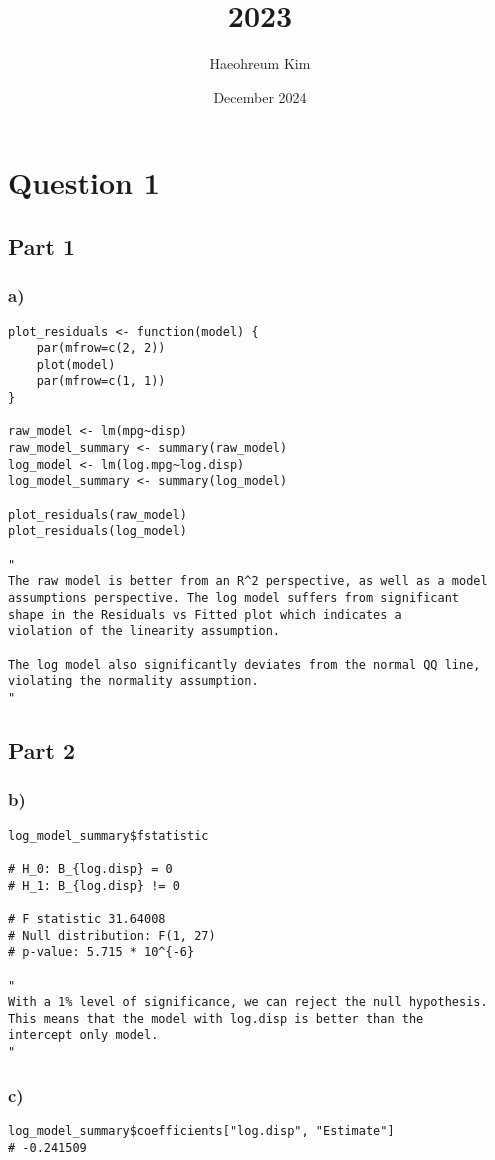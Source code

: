 \documentclass{article}
\title{2023}
\author{Haeohreum Kim}
\date{December 2024}
\begin{document}
\maketitle
\section*{Question 1}
\subsection*{Part 1}
\subsubsection*{a)}
\begin{verbatim}
plot_residuals <- function(model) {
    par(mfrow=c(2, 2))
    plot(model)
    par(mfrow=c(1, 1))
}

raw_model <- lm(mpg~disp)
raw_model_summary <- summary(raw_model)
log_model <- lm(log.mpg~log.disp)
log_model_summary <- summary(log_model)

plot_residuals(raw_model)
plot_residuals(log_model)

"
The raw model is better from an R^2 perspective, as well as a model
assumptions perspective. The log model suffers from significant
shape in the Residuals vs Fitted plot which indicates a
violation of the linearity assumption. 

The log model also significantly deviates from the normal QQ line,
violating the normality assumption.
"
\end{verbatim}
\subsection*{Part 2}
\subsubsection*{b)}
\begin{verbatim}
log_model_summary$fstatistic

# H_0: B_{log.disp} = 0
# H_1: B_{log.disp} != 0

# F statistic 31.64008
# Null distribution: F(1, 27)
# p-value: 5.715 * 10^{-6}

"
With a 1% level of significance, we can reject the null hypothesis.
This means that the model with log.disp is better than the
intercept only model. 
"
\end{verbatim}
\subsubsection*{c)}
\begin{verbatim}
log_model_summary$coefficients["log.disp", "Estimate"]
# -0.241509
\end{verbatim}
\end{document}
